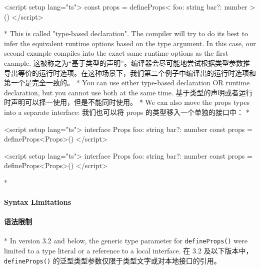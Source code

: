 \begin{paracol}{2}
\begin{codeHtml}
\end{codeHtml}
\switchcolumn
\begin{codeHtml}
<script setup lang="ts">
const props = defineProps<{
  foo: string
  bar?: number
}>()
</script>
\end{codeHtml}
\switchcolumn[0]*%
This is called "type-based declaration". The compiler will try to do its
best to infer the equivalent runtime options based on the type argument.
In this case, our second example compiles into the exact same runtime
options as the first example.
\switchcolumn
这被称之为``基于类型的声明''。编译器会尽可能地尝试根据类型参数推导出等价的运行时选项。在这种场景下，我们第二个例子中编译出的运行时选项和第一个是完全一致的。
\switchcolumn[0]*%
You can use either type-based declaration OR runtime declaration, but
you cannot use both at the same time.
\switchcolumn
基于类型的声明或者运行时声明可以择一使用，但是不能同时使用。
\switchcolumn[0]*%
We can also move the props types into a separate interface:
\switchcolumn
我们也可以将 props 的类型移入一个单独的接口中：
\switchcolumn[0]*%
\begin{codeHtml}
<script setup lang="ts">
interface Props {
  foo: string
  bar?: number
}
const props = defineProps<Props>()
</script>
\end{codeHtml}
\switchcolumn
\begin{codeHtml}
<script setup lang="ts">
interface Props {
  foo: string
  bar?: number
}
const props = defineProps<Props>()
</script>
\end{codeHtml}
\switchcolumn[0]*%
\paragraph{Syntax Limitations}
\switchcolumn
\paragraph{语法限制}
\switchcolumn[0]*%
In version 3.2 and below, the generic type parameter for
\texttt{defineProps()} were limited to a type literal or a reference to
a local interface.
\switchcolumn
在 3.2 及以下版本中，\texttt{defineProps()}
的泛型类型参数仅限于类型文字或对本地接口的引用。
\end{paracol}




